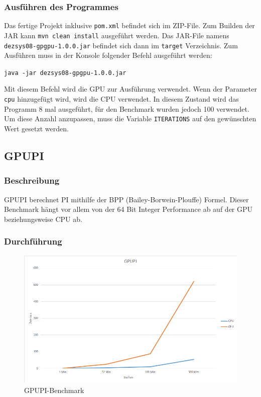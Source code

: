 \subsubsection{Ausführen des Programmes}
Das fertige Projekt inklusive \texttt{pom.xml} befindet sich im ZIP-File. Zum Builden der JAR kann \texttt{mvn clean install} ausgeführt werden. Das JAR-File namens \texttt{dezsys08-gpgpu-1.0.0.jar} befindet sich dann im \texttt{target} Verzeichnis. Zum Ausführen muss in der Konsole folgender Befehl ausgeführt werden:
\begin{center}
\texttt{java -jar dezsys08-gpgpu-1.0.0.jar}
\end{center}
Mit diesem Befehl wird die GPU zur Ausführung verwendet. Wenn der Parameter \texttt{cpu} hinzugefügt wird, wird die CPU verwendet. In diesem Zustand wird das Programm 8 mal ausgeführt, für den Benchmark wurden jedoch 100 verwendet. Um diese Anzahl anzupassen, muss die Variable \texttt{ITERATIONS} auf den gewünschten Wert gesetzt werden.
\newpage
\subsection{GPUPI}
\subsubsection{Beschreibung}
GPUPI berechnet PI mithilfe der BPP (Bailey-Borwein-Plouffe) Formel. Dieser Benchmark hängt vor allem von der 64 Bit Integer Performance ab auf der GPU beziehungsweise CPU ab.
\subsubsection{Durchführung}
\begin{figure}[!h]
	\begin{center}
		\includegraphics[width=17cm]{images/gpupi.png}
		\caption{GPUPI-Benchmark}
	\end{center}
\end{figure}
